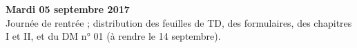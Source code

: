 \documentclass[12pt,a4paper]{article}
\begin{document}
% 
%  
% 
%   
% 

\noindent\textbf{\bf Mardi 05 septembre 2017}\\
Journée de rentrée ; distribution des feuilles de TD, des formulaires, des
chapitres I et II, et du DM n° 01 (à rendre le 14 septembre).\vspace{.4cm}\\


\label{end}
\end{document}
